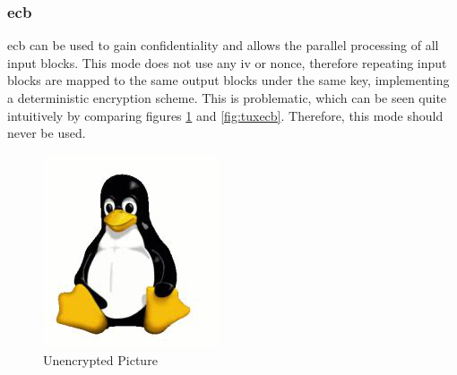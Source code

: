 \subsubsection{\gls{ecb}}\label{deterministicEnc}

\gls{ecb} can be used to gain confidentiality and allows the parallel processing of all input blocks. This mode does not use any \gls{iv} or nonce, therefore
repeating input blocks are mapped to the same output blocks under the same key, implementing a deterministic encryption scheme.
This is problematic, which can be seen quite intuitively by comparing 
figures \ref{fig:tuxclr} and \ref{fig:tuxecb}. Therefore, this mode should never be used.
\\
 \begin{minipage}{\linewidth}
      \centering
      \begin{minipage}{0.4\linewidth}
          \begin{figure}[H]
              \includegraphics[width=\linewidth]{figures/TuxCleartext.png}
              \caption{Unencrypted Picture}
              \label{fig:tuxclr}
          \end{figure}
      \end{minipage}
      \hspace{0.05\linewidth}

\end{minipage}
